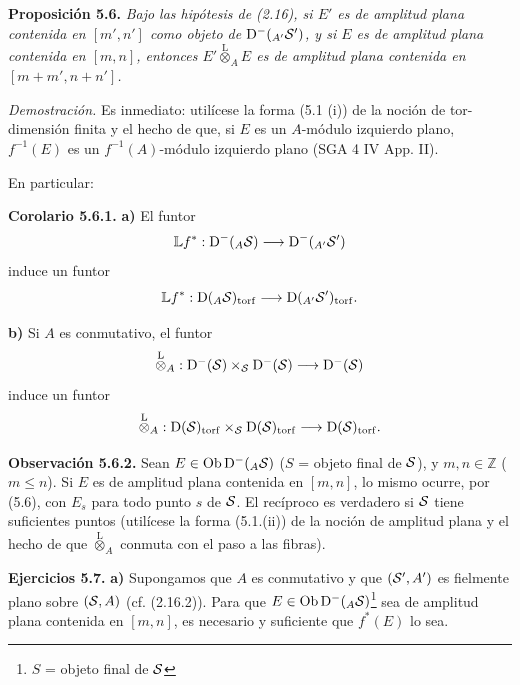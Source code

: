 \textbf{Proposición 5.6.} \emph{Bajo las hipótesis de (2.16), si \(E'\) es de amplitud plana contenida en \([m',n']\) como objeto de \(\sisi{\Dpx^-({}_A, S')}{\Dpx^-({}_{A'}\mathcal S')}\), y si \(E\) es de amplitud plana contenida en \([m,n]\), entonces \(E'\overset{\mathrm L}{\otimes}_A E\) es de amplitud plana contenida en \([m+m',n+n']\).}

\emph{Demostración.} Es inmediato: utilícese la forma (5.1 (i)) de la noción de tor-dimensión finita y el hecho de que, si \(E\) es un \(A\)-módulo izquierdo plano, \(f^{-1}(E)\) es un \(f^{-1}(A)\)-módulo izquierdo plano (SGA 4 IV App. II).

En particular:

\textbf{Corolario 5.6.1.} \textbf{a)} El funtor
\[
  \mathbb L f^*:\Dpx^-({}_A \sisi{S}{\mathcal S})\longrightarrow \sisi{\Dpx^-({}_A, S')}{\Dpx^-({}_{A'}\mathcal S')}
\]
induce un funtor
\[
  \mathbb L f^*:\Dpx({}_A \sisi{S}{\mathcal S})_{\torf}\longrightarrow \sisi{\Dpx({}_A, S')_{\torf}}{\Dpx({}_{A'}\mathcal S')_{\torf}}.
\]

\textbf{b)} Si \(A\) es conmutativo, el funtor
\[
  \overset{\mathrm L}{\otimes}_A:
  \Dpx^-(\sisi{S}{\mathcal S})\times\sisi{_S}{_{\mathcal S}}\Dpx^-(\sisi{S}{\mathcal S})
  \longrightarrow \Dpx^-(\sisi{S}{\mathcal S})
\]
induce un funtor
\[
  \overset{\mathrm L}{\otimes}_A:
  \Dpx(\sisi{S}{\mathcal S})_{\torf}\times\sisi{_S}{_{\mathcal S}}\Dpx(\sisi{S}{\mathcal S})_{\torf}
  \longrightarrow \Dpx(\sisi{S}{\mathcal S})_{\torf}.
\]

\textbf{Observación 5.6.2.} Sean \(E\in\Ob\Dpx^-({}_A \sisi{S}{\mathcal S})\) (\(S\) = objeto final de \(\sisi{S}{\mathcal S}\)), y \(m,n\in\mathbb Z\) (\(m\leq n\)). Si \(E\) es de amplitud plana contenida en \([m,n]\), lo mismo ocurre, por (5.6), con \(E_s\) para todo punto \(s\) de \(\sisi{S}{\mathcal S}\). El recíproco es verdadero si \(\sisi{S}{\mathcal S}\) tiene suficientes puntos (utilícese la forma (5.1.(ii)) de la noción de amplitud plana y el hecho de que \(\overset{\mathrm L}{\otimes}_A\) conmuta con el paso a las fibras).

\textbf{Ejercicios 5.7.} \textbf{a)} Supongamos que \(A\) es conmutativo y que \((\sisi{S'}{\mathcal S'},A')\) es fielmente plano sobre \((\sisi{S}{\mathcal S},A)\) (cf. (2.16.2)). Para que \(E\in\Ob\Dpx^-({}_A \sisi{S}{\mathcal S})\)\footnote{\(S\) = objeto final de \(\sisi{S}{\mathcal S}\)} sea de amplitud plana contenida en \([m,n]\), es necesario y suficiente que \(f^*(E)\) lo sea.

